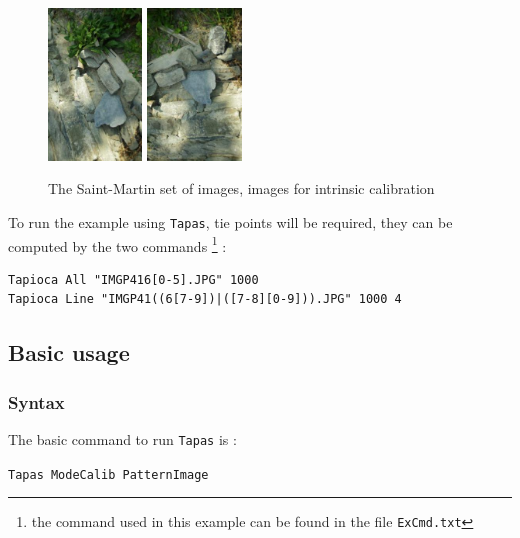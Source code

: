 \begin{figure}[H]
\begin{center}
\includegraphics[width=25mm]{FIGS/MurSaintMartin/Small-IMGP4164.JPG}
\includegraphics[width=25mm]{FIGS/MurSaintMartin/Small-IMGP4165.JPG}
\end{center}
\caption{The Saint-Martin set of images, images for intrinsic calibration}
\label{FIG:StM:Calib}
\end{figure}

To run the example using {\tt Tapas}, tie points will be required, they can
be computed by the two  commands \footnote{the command used in this example can be found in  
the file {\tt ExCmd.txt}} :


\begin{verbatim}
Tapioca All "IMGP416[0-5].JPG" 1000
Tapioca Line "IMGP41((6[7-9])|([7-8][0-9])).JPG" 1000 4
\end{verbatim}


\subsection{Basic usage}


\label{Basi:Tapas}

\subsubsection{Syntax}

The basic command to run  {\tt Tapas} is :

\begin{center}
   {\tt Tapas  ModeCalib  PatternImage}
\end{center}

